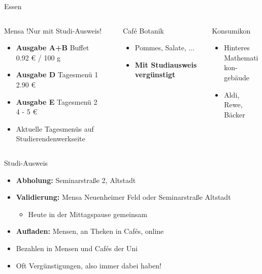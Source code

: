 \documentclass[t,aspectratio=1610, 12pt]{beamer} %
\begin{document}
\begin{frame}{Essen}
	\begin{columns}
		\begin{column}{.4\textwidth}
			\begin{block}{Mensa}
				\centering	!Nur mit Studi-Ausweis!
				\begin{itemize}
					\item \textbf{Ausgabe A+B} Buffet\\ 0.92 € / 100 g
					\item \textbf{Ausgabe D} Tagesmenü 1\\ 2.90 €
					\item \textbf{Ausgabe E} Tagesmenü 2\\ 4 - 5 €
					\item Aktuelle Tagesmenüs auf Studierendenwerkseite
				\end{itemize}
			\end{block}
		\end{column}
		\begin{column}{.3\textwidth}
			\begin{block}{Café Botanik}
				\begin{itemize}
					\item Pommes, Salate, ...
					\item \textbf{Mit Studiausweis vergünstigt}
				\end{itemize}
			\end{block}
		\end{column}
		\begin{column}{.3\textwidth}
			\begin{block}{Konsumikon}
				\begin{itemize}
					\item Hinteres \\ Mathematikon-\\gebäude
					\item Aldi, Rewe, Bäcker
				\end{itemize}
			\end{block}
		\end{column}
	\end{columns}
\end{frame}

\begin{frame}{Studi-Ausweis}
	\begin{itemize}
		\item \textbf{Abholung:} Seminarstraße 2, Altstadt
		\item \textbf{Validierung:} Mensa Neuenheimer Feld oder Seminarstraße Altstadt
		\begin{itemize}
			\item Heute in der Mittagspause gemeinsam
		\end{itemize}
		\item \textbf{Aufladen:} Mensen, an Theken in Cafés, online
		\item Bezahlen in Mensen und Cafés der Uni
		\item Oft Vergünstigungen, also immer dabei haben!
	\end{itemize}
\end{frame}
\end{document}
